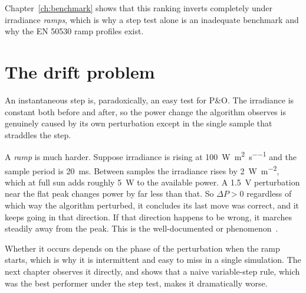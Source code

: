 Chapter~\ref{ch:benchmark} shows that this ranking inverts completely under
irradiance \emph{ramps}, which is why a step test alone is an inadequate
benchmark and why the EN 50530 ramp profiles exist.

\section{The drift problem}
\label{sec:drift}

An instantaneous step is, paradoxically, an easy test for P\&O. The irradiance
is constant both before and after, so the power change the algorithm observes is
genuinely caused by its own perturbation except in the single sample that
straddles the step.

A \emph{ramp} is much harder. Suppose irradiance is rising at
\SI{100}{\watt\per\square\metre\per\second} and the sample period is
\SI{20}{\milli\second}. Between samples the irradiance rises by
\SI{2}{\watt\per\square\metre}, which at full sun adds roughly \SI{5}{\watt} to
the available power. A \SI{1.5}{\volt} perturbation near the flat peak changes
power by far less than that. So $\Delta P > 0$ regardless of which way the
algorithm perturbed, it concludes its last move was correct, and it keeps going
in that direction. If that direction happens to be wrong, it marches steadily
away from the peak. This is the well-documented  or
 phenomenon~\cite{femia}.

Whether it occurs depends on the phase of the perturbation when the ramp starts,
which is why it is intermittent and easy to miss in a single simulation. The
next chapter observes it directly, and shows that a naive variable-step rule,
which was the best performer under the step test, makes it dramatically worse.

